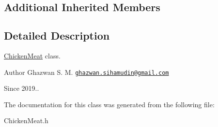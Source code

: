 \subsection*{Additional Inherited Members}


\subsection{Detailed Description}
\hyperlink{classChickenMeat}{Chicken\+Meat} class.

\begin{DoxyAuthor}{Author}
Ghazwan S. M. \href{mailto:ghazwan.sihamudin@gmail.com}{\tt ghazwan.\+sihamudin@gmail.\+com} 
\end{DoxyAuthor}
\begin{DoxySince}{Since}
2019.. 
\end{DoxySince}


The documentation for this class was generated from the following file\+:\begin{DoxyCompactItemize}
\item 
Chicken\+Meat.\+h\end{DoxyCompactItemize}
